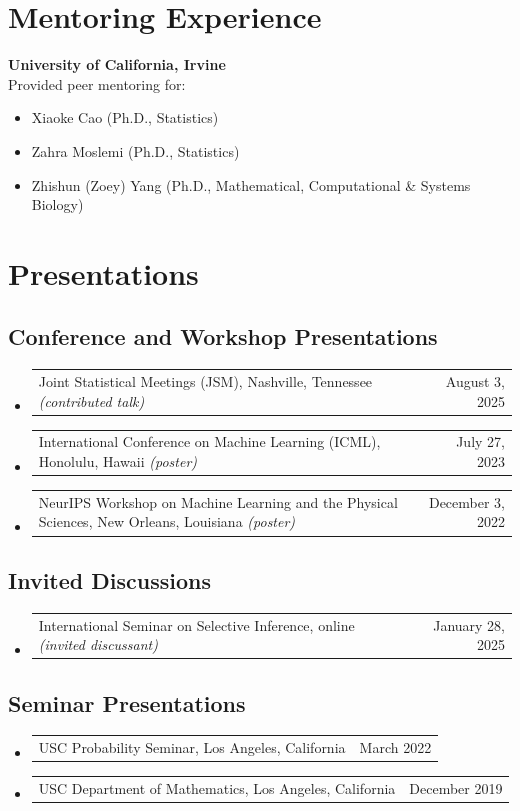\documentclass[11pt]{article}
\makeatletter
\newcommand{\cvrow}[2]{%
  \begin{tabularx}{\textwidth}{@{}Xr@{}}#1 & #2\end{tabularx}}
\makeatother
\begin{document}
\clearpage
\section{Mentoring Experience}

\textbf{University of California, Irvine}\\
Provided peer mentoring for:
\begin{itemize}[leftmargin=1.5em,label=\textbullet]
  \item Xiaoke Cao (Ph.D., Statistics)
  \item Zahra Moslemi (Ph.D., Statistics)
  \item Zhishun (Zoey) Yang (Ph.D., Mathematical, Computational \& Systems Biology)
\end{itemize}

\section{Presentations}

\subsection*{Conference and Workshop Presentations}
\begin{itemize}
  \item \cvrow{Joint Statistical Meetings (JSM), Nashville, Tennessee \textit{(contributed talk)}}{August 3, 2025}
  \item \cvrow{International Conference on Machine Learning (ICML), Honolulu, Hawaii \textit{(poster)}}{July 27, 2023}
  \item \cvrow{NeurIPS Workshop on Machine Learning and the Physical Sciences, New Orleans, Louisiana \textit{(poster)}}{December 3, 2022}
\end{itemize}

\subsection*{Invited Discussions}
\begin{itemize}
  \item \cvrow{International Seminar on Selective Inference, online \textit{(invited discussant)}}{January 28, 2025}
\end{itemize}

\subsection*{Seminar Presentations}
\begin{itemize}
  \item \cvrow{USC Probability Seminar, Los Angeles, California}{March 2022}
  \item \cvrow{USC Department of Mathematics, Los Angeles, California}{December 2019}
\end{itemize}
\end{document}
